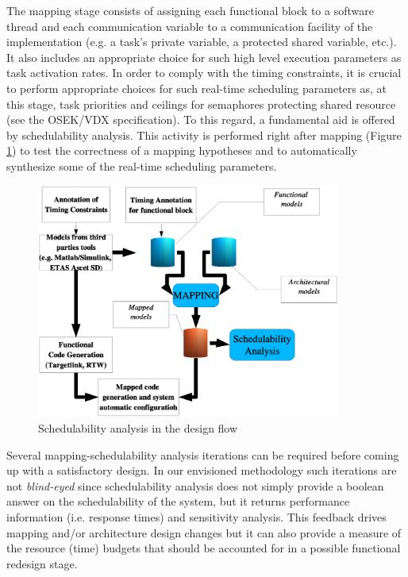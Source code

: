 The mapping stage consists of assigning each functional block to a
software thread and each communication variable to a communication
facility of the implementation (e.g. a task's private variable, a
protected shared variable, etc.). It also includes an appropriate
choice for such high level execution parameters as task activation
rates. In order to comply with the timing constraints, it is crucial
to perform appropriate choices for such real-time scheduling
parameters as, at this stage, task priorities and ceilings for
semaphores protecting shared resource (see the OSEK/VDX
specification). To this regard, a fundamental aid is offered by
schedulability analysis. This activity is performed right after
mapping (Figure \ref{fig:Schedulability-analysis}) to test the
correctness of a mapping hypotheses and to automatically synthesize
some of the real-time scheduling parameters.


\begin{figure}
\begin{center}
\includegraphics[width=10cm]{images/flow}
\par\end{center}
\caption{\label{fig:Schedulability-analysis}Schedulability analysis in
  the design flow}
\end{figure}


Several mapping-schedulability analysis iterations can be required
before coming up with a satisfactory design. In our envisioned
methodology such iterations are not \emph{blind-eyed} since
schedulability analysis does not simply provide a boolean answer on
the schedulability of the system, but it returns performance
information (i.e. response times) and sensitivity analysis. This
feedback drives mapping and/or architecture design changes but it can
also provide a measure of the resource (time) budgets that should be
accounted for in a possible functional redesign stage.


